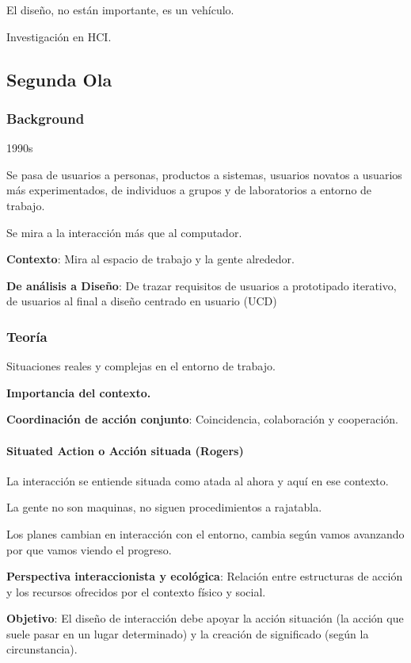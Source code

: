 \documentclass[12pt]{report} %
\begin{document}
El diseño, no están importante, es un vehículo.

Investigación en HCI.

\subsection{Segunda Ola}

\subsubsection{Background}

1990s

Se pasa de usuarios a personas, productos a sistemas, usuarios novatos a
usuarios más experimentados, de individuos a grupos y de laboratorios a
entorno de trabajo.

Se mira a la interacción más que al computador.

\textbf{Contexto}: Mira al espacio de trabajo y la gente alrededor.

\textbf{De análisis a Diseño}: De trazar requisitos de usuarios a
prototipado iterativo, de usuarios al final a diseño centrado en usuario
(UCD)

\subsubsection{Teoría}

Situaciones reales y complejas en el entorno de trabajo.

\textbf{Importancia del contexto.}

\textbf{Coordinación de acción conjunto}: Coincidencia, colaboración y
cooperación.

\paragraph{Situated Action o Acción situada (Rogers)}

La interacción se entiende situada como atada al ahora y aquí en ese
contexto.

La gente no son maquinas, no siguen procedimientos a rajatabla.

Los planes cambian en interacción con el entorno, cambia según vamos
avanzando por que vamos viendo el progreso.

\textbf{Perspectiva interaccionista y ecológica}: Relación entre
estructuras de acción y los recursos ofrecidos por el contexto físico y
social.

\textbf{Objetivo}: El diseño de interacción debe apoyar la acción
situación (la acción que suele pasar en un lugar determinado) y la
creación de significado (según la circunstancia).
\end{document}
